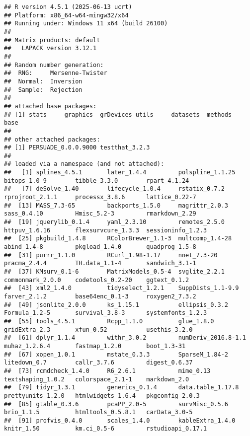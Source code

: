 \documentclass[
]{article}
\begin{document}
\begin{verbatim}
## R version 4.5.1 (2025-06-13 ucrt)
## Platform: x86_64-w64-mingw32/x64
## Running under: Windows 11 x64 (build 26100)
## 
## Matrix products: default
##   LAPACK version 3.12.1
## 
## Random number generation:
##  RNG:     Mersenne-Twister 
##  Normal:  Inversion 
##  Sample:  Rejection 
##  
## attached base packages:
## [1] stats     graphics  grDevices utils     datasets  methods   base     
## 
## other attached packages:
## [1] PERSUADE_0.0.0.9000 testthat_3.2.3     
## 
## loaded via a namespace (and not attached):
##   [1] splines_4.5.1       later_1.4.4         polspline_1.1.25    bitops_1.0-9        tibble_3.3.0        rpart_4.1.24       
##   [7] deSolve_1.40        lifecycle_1.0.4     rstatix_0.7.2       rprojroot_2.1.1     processx_3.8.6      lattice_0.22-7     
##  [13] MASS_7.3-65         backports_1.5.0     magrittr_2.0.3      sass_0.4.10         Hmisc_5.2-3         rmarkdown_2.29     
##  [19] jquerylib_0.1.4     yaml_2.3.10         remotes_2.5.0       httpuv_1.6.16       flexsurvcure_1.3.3  sessioninfo_1.2.3  
##  [25] pkgbuild_1.4.8      RColorBrewer_1.1-3  multcomp_1.4-28     abind_1.4-8         pkgload_1.4.0       quadprog_1.5-8     
##  [31] purrr_1.1.0         RCurl_1.98-1.17     nnet_7.3-20         pracma_2.4.4        TH.data_1.1-4       sandwich_3.1-1     
##  [37] KMsurv_0.1-6        MatrixModels_0.5-4  svglite_2.2.1       commonmark_2.0.0    codetools_0.2-20    ggtext_0.1.2       
##  [43] xml2_1.4.0          tidyselect_1.2.1    SuppDists_1.1-9.9   farver_2.1.2        base64enc_0.1-3     roxygen2_7.3.2     
##  [49] jsonlite_2.0.0      ks_1.15.1           ellipsis_0.3.2      Formula_1.2-5       survival_3.8-3      systemfonts_1.2.3  
##  [55] tools_4.5.1         Rcpp_1.1.0          glue_1.8.0          gridExtra_2.3       xfun_0.52           usethis_3.2.0      
##  [61] dplyr_1.1.4         withr_3.0.2         numDeriv_2016.8-1.1 muhaz_1.2.6.4       fastmap_1.2.0       boot_1.3-31        
##  [67] xopen_1.0.1         mstate_0.3.3        SparseM_1.84-2      litedown_0.7        callr_3.7.6         digest_0.6.37      
##  [73] rcmdcheck_1.4.0     R6_2.6.1            mime_0.13           textshaping_1.0.2   colorspace_2.1-1    markdown_2.0       
##  [79] tidyr_1.3.1         generics_0.1.4      data.table_1.17.8   prettyunits_1.2.0   htmlwidgets_1.6.4   pkgconfig_2.0.3    
##  [85] gtable_0.3.6        pcaPP_2.0-5         survMisc_0.5.6      brio_1.1.5          htmltools_0.5.8.1   carData_3.0-5      
##  [91] profvis_0.4.0       scales_1.4.0        kableExtra_1.4.0    knitr_1.50          km.ci_0.5-6         rstudioapi_0.17.1  

\end{verbatim}
\end{document}
